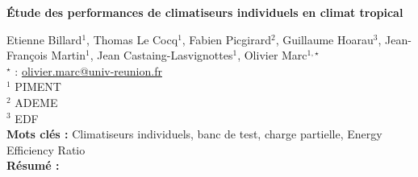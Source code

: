 


    \newpage


%
\begin{flushleft}
\addtocounter{section}{1}
{\Large \textbf{Étude des performances de climatiseurs individuels en climat tropical}}\label{ref:42}
\end{flushleft}
%
Etienne Billard$^{1}$, Thomas Le Cocq$^{1}$, Fabien Picgirard$^{2}$, Guillaume Hoarau$^{3}$, Jean-François Martin$^{1}$, Jean Castaing-Lasvignottes$^{1}$, Olivier Marc$^{1,\star}$\\[2mm]
$^{\star}$ \Letter : \url{olivier.marc@univ-reunion.fr}\\[2mm]
{\footnotesize $^{1}$ PIMENT}\\
{\footnotesize $^{2}$ ADEME}\\
{\footnotesize $^{3}$ EDF}\\
[4mm]
%
\noindent \textbf{Mots clés : } Climatiseurs individuels, banc de test, charge partielle, Energy Efficiency Ratio\\[4mm]
%
\noindent \textbf{Résumé : } 

